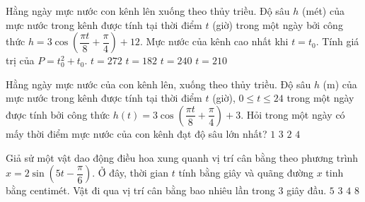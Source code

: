 \begin{ex}%
	Hằng ngày mực nước con kênh lên xuống theo thủy triều. Độ sâu $ h$ (mét) của mực nước trong kênh được tính tại thời điểm $ t$ (giờ) trong một ngày bởi công thức $ h=3\cos\left(\dfrac{\pi t}{8}+\dfrac{\pi}{4}\right)+12$. Mực nước của kênh cao nhất khi $ t=t_0$. Tính giá trị của $ P=t_0^2+t_0$.
	\choice
	{$ t=272$}
	{$ t=182$}
	{$ t=240$}
	{\True $ t=210$}
\end{ex}

\begin{ex}%
	Hằng ngày mực nước của con kênh lên, xuống theo thủy triều. Độ sâu $h$ (m) của mực nước trong kênh được tính tại thời điểm $t$ (giờ), $0\le t\le 24$ trong một ngày được tính bởi công thức $h(t)=3\cos \left(\dfrac{\pi t}{8}+\dfrac{\pi}{4} \right)+3$. Hỏi trong một ngày có mấy thời điểm mực nước của con kênh đạt độ sâu lớn nhất?
	\choice
	{ \True $1$}
	{ $3$}
	{ $2$}
	{ $4$}
\end{ex}


\begin{ex}%
	Giả sử một vật dao động điều hoa xung quanh vị trí cân bằng theo phương trình $x=2\sin\left(5t-\dfrac{\pi}{6} \right) $. Ở đây, thời gian $t$ tính bằng giây và quãng đường $x$ tinh bằng centimét. Vật đi qua vị trí cân bằng bao nhiêu lần trong $ 3 $ giây đầu.
	\choice
	{\True $ 5 $}
	{$ 3 $}
	{$ 4 $}
	{$ 8 $}
\end{ex}


